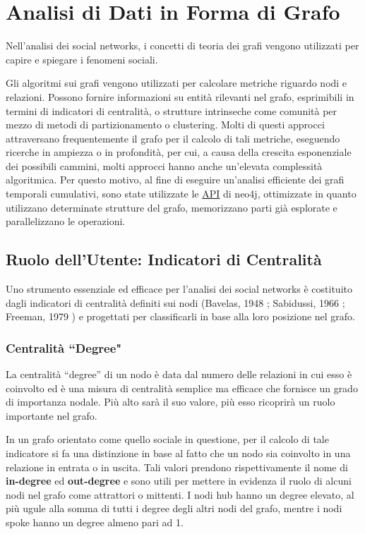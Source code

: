 \chapter{Analisi di Dati in Forma di Grafo}

Nell'analisi dei social networks, i concetti di teoria dei grafi vengono utilizzati per capire e spiegare i fenomeni sociali.

Gli algoritmi sui grafi vengono utilizzati per calcolare metriche riguardo nodi e relazioni. Possono fornire informazioni su entit{\`a} rilevanti nel grafo, esprimibili in termini di indicatori di centralit{\`a}, o strutture intrinseche come comunit{\`a} per mezzo di metodi di partizionamento o clustering. Molti di questi approcci attraversano frequentemente il grafo per il calcolo di tali metriche, eseguendo ricerche in ampiezza o in profondit{\`a}, per cui, a causa della crescita esponenziale dei possibili cammini, molti approcci hanno anche un'elevata complessit{\`a} algoritmica. Per questo motivo, al fine di eseguire un'analisi efficiente dei grafi temporali cumulativi, sono state utilizzate le \href{https://github.com/neo4j-contrib/neo4j-graph-algorithms}{API} di neo4j, ottimizzate in quanto utilizzano determinate strutture del grafo, memorizzano parti gi{\`a} esplorate e parallelizzano le operazioni.

\section{Ruolo dell'Utente: Indicatori di Centralit{\`a}}

Uno strumento essenziale ed efficace per l'analisi dei social networks {\`e} costituito dagli indicatori di centralit{\`a} definiti sui nodi (Bavelas, 1948 \cite{Bavelas-centrality}; Sabidussi, 1966 \cite{Sabidussi-centrality}; Freeman, 1979 \cite{Freeman-centrality}) e  progettati per classificarli in base alla loro posizione nel grafo.

\subsection{Centralit{\`a} ``Degree"}

La centralit{\`a} ``degree'' di un nodo {\`e} data dal numero delle relazioni in cui esso {\`e} coinvolto ed {\`e} una misura di centralit{\`a} semplice ma efficace che fornisce un grado di importanza nodale. Pi{\`u} alto sar{\`a} il suo valore, pi{\`u} esso ricoprir{\`a} un ruolo importante nel grafo. 

In un grafo orientato come quello sociale in questione, per il calcolo di tale indicatore si fa una distinzione in base al fatto che un nodo sia coinvolto in una relazione in entrata o in uscita. Tali valori prendono rispettivamente il nome di \textbf{in-degree} ed \textbf{out-degree} e sono utili per mettere in evidenza il ruolo di alcuni nodi nel grafo come attrattori o mittenti. I nodi hub hanno un degree elevato, al pi{\`u} ugule alla somma di tutti i degree degli altri nodi del grafo, mentre i nodi spoke hanno un degree almeno pari ad 1. 

